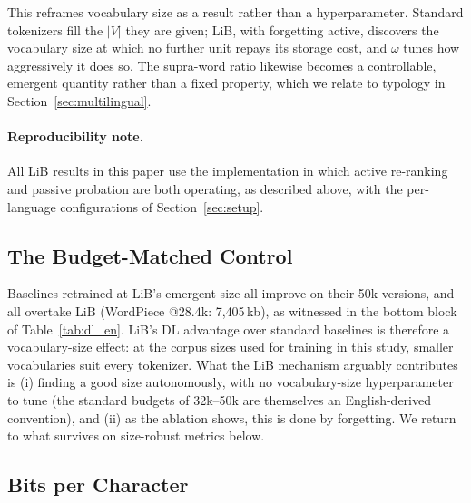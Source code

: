 \documentclass[pdflatex,sn-apa]{sn-jnl}
\begin{document}
This reframes vocabulary size as a result rather than a
hyperparameter. Standard tokenizers fill the $|V|$ they are given; LiB, with
forgetting active, discovers the vocabulary size at which no further unit repays
its storage cost, and $\omega$ tunes how aggressively it does so.
The supra-word
ratio likewise becomes a controllable, emergent quantity rather than a fixed
property, which we relate to typology in Section~\ref{sec:multilingual}.

\paragraph{Reproducibility note.}
All LiB results in this paper use the implementation in which active
re-ranking and passive probation are both operating, as described above, with
the per-language configurations of Section~\ref{sec:setup}.


\subsection{The Budget-Matched Control}
\label{sec:budgetmatched}

Baselines retrained at LiB's emergent size all improve on their 50k
versions, and all overtake LiB (WordPiece @28.4k: 7{,}405\,kb), as witnessed in the bottom block of Table~\ref{tab:dl_en}.
LiB's DL advantage over standard baselines is therefore a
vocabulary-size effect: at the corpus sizes used for training in this study, smaller vocabularies suit every tokenizer.
What the LiB mechanism arguably contributes is (i) finding a good size
autonomously, with no vocabulary-size hyperparameter to tune (the standard
budgets of 32k--50k are themselves an English-derived convention), and
(ii) as the ablation shows, this is done by forgetting.
We return to what survives on size-robust metrics below.

\subsection{Bits per Character}
\end{document}

